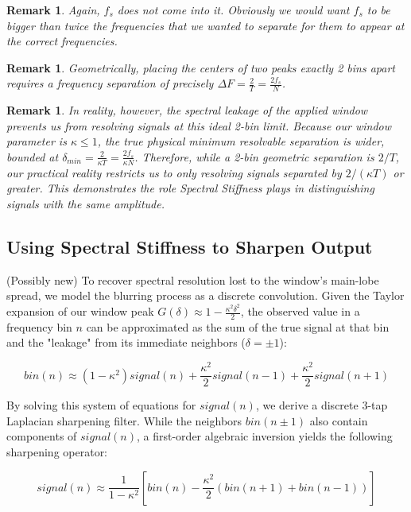 \documentclass[11pt]{article}
\theoremstyle{breakdef}
\newtheorem{remark}[theorem]{Remark}
\begin{document}
\begin{remark}
Again, $f_s$ does not come into it.  Obviously we would want  $f_s$ to be bigger than twice the frequencies that we wanted to separate for them to appear at the correct frequencies.  
\end{remark}

\begin{remark}
Geometrically, placing the centers of two peaks exactly 2 bins apart requires a frequency separation of precisely $\Delta F = \frac{2}{T} = \frac{2f_s}{N}$.
\end{remark}

\begin{remark}
In reality, however, the spectral leakage of the applied window prevents us from resolving signals at this ideal 2-bin limit. Because our window parameter is $\kappa \le 1$, the true physical minimum resolvable separation is wider, bounded at $\delta_{min} = \frac{2}{\kappa T} = \frac{2f_s}{\kappa N}$. Therefore, while a 2-bin geometric separation is $2/T$, our practical reality restricts us to only resolving signals separated by $2/(\kappa T)$ or greater. This demonstrates the role Spectral Stiffness plays in distinguishing signals with the same amplitude. 
\end{remark}


\subsection{Using Spectral Stiffness to Sharpen Output}
(Possibly new)
To recover spectral resolution lost to the window's main-lobe spread, we model the blurring process as a discrete convolution. Given the Taylor expansion of our window peak $G(\delta) \approx 1 - \frac{\kappa^2 \delta^2}{2}$, the observed value in a frequency bin $n$ can be approximated as the sum of the true signal at that bin and the "leakage" from its immediate neighbors ($\delta = \pm 1$):

\begin{equation}
bin(n) \approx (1 - \kappa^2) signal(n) + \frac{\kappa^2}{2} signal(n-1) + \frac{\kappa^2}{2} signal(n+1)
\end{equation}

By solving this system of equations for $signal(n)$, we derive a discrete 3-tap Laplacian sharpening filter. While the neighbors $bin(n \pm 1)$ also contain components of $signal(n)$, a first-order algebraic inversion yields the following sharpening operator:

\begin{equation}
signal(n) \approx \frac{1}{1 - \kappa^2} \left[ bin(n) - \frac{\kappa^2}{2} \left( bin(n+1) + bin(n-1) \right) \right]
\end{equation}
\end{document}
